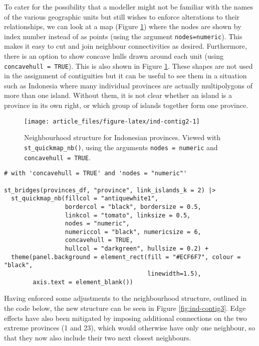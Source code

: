 To cater for the possibility that a modeller might not be familiar with the names of the various geographic units but still wishes to enforce alterations to their relationships, we can look at a map (Figure \ref{fig:ind-contig2}) where the nodes are shown by
index number instead of as points (using the argument \texttt{nodes=\textquotesingle{}numeric\textquotesingle{}}). This makes it easy to cut and join neighbour connectivities as desired. Furthermore, there is an option to
show concave hulls drawn around each unit (using \texttt{concavehull\ =\ TRUE}). This is also shown in Figure \ref{fig:ind-contig2}. These shapes are not used in the assignment of contiguities but it can be useful to see them in a situation such as Indonesia where many individual provinces are actually multipolygons of more than one island. Without them, it is not clear whether an island is a province in its own right, or which group of islands together form one province.



\begin{figure}

{\centering \texttt{[image: article\_files/figure-latex/ind-contig2-1]} 

}

\caption{Neighbourhood structure for Indonesian provinces. Viewed with \texttt{st\_quickmap\_nb()}, using the arguments \texttt{nodes\ =\ \textquotesingle{}numeric\textquotesingle{}} and \texttt{concavehull\ =\ TRUE}.}\label{fig:ind-contig2}
\end{figure}

\begin{verbatim}
# with 'concavehull = TRUE' and 'nodes = "numeric"'

st_bridges(provinces_df, "province", link_islands_k = 2) |>
  st_quickmap_nb(fillcol = "antiquewhite1",
                 bordercol = "black", bordersize = 0.5,
                 linkcol = "tomato", linksize = 0.5,
                 nodes = "numeric",
                 numericcol = "black", numericsize = 6,
                 concavehull = TRUE,
                 hullcol = "darkgreen", hullsize = 0.2) +
  theme(panel.background = element_rect(fill = "#ECF6F7", colour = "black",
                                        linewidth=1.5),
        axis.text = element_blank())
\end{verbatim}

Having enforced some adjustments to the neighbourhood structure, outlined in the code below, the
new structure can be seen in Figure \ref{fig:ind-contig3}. Edge effects
have also been mitigated by imposing additional connections on the two extreme
provinces (1 and 23), which would otherwise have only one neighbour, so that they now also include
their two next closest neighbours.



